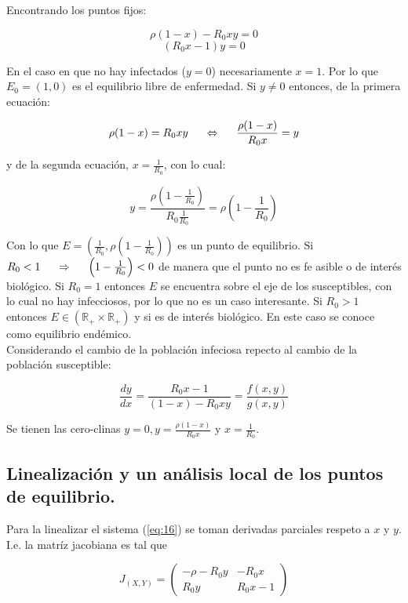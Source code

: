 \documentclass[10pt,oneside]{article}
\theoremstyle{definition}
\begin{document}
\begin{multicols}{2}
    Encontrando los puntos fijos:

    $$\rho(1-x)-R_0xy=0$$
    $$(R_0x-1)y=0$$

    En el caso en que no hay infectados ($y=0$) necesariamente $x=1$. Por lo que $E_0=(1,0)$ es el equilibrio libre de enfermedad. Si $y\neq 0$ entonces, de la primera ecuación: 

    $$\rho(1-x)=R_0xy\hspace{0.5cm}\Leftrightarrow\hspace{0.5cm}\frac{\rho(1-x)}{R_0x}=y$$

    y de la segunda ecuación, $x=\displaystyle{\frac{1}{R_0}}$, con lo cual:

    $$y=\frac{\rho\left(1-\frac{1}{R_0}\right)}{R_0\frac{1}{R_0}}=\rho\left(1-\frac{1}{R_0}\right)$$

    Con lo que $\displaystyle{E=\left(\frac{1}{R_0}, \rho\left(1-\frac{1}{R_0}\right)\right)}$ es un punto de equilibrio. Si $R_0<1\hspace{0.5cm}\Rightarrow\hspace{0.5cm}\left(1-\frac{1}{R_0}\right)<0$ de manera que el punto no es fe asible o de interés biológico. Si $R_0=1$ entonces $E$ se encuentra sobre el eje de los susceptibles, con lo cual no hay infecciosos, por lo que no es un caso interesante. Si $R_0>1$ entonces $E \in (\mathbb{R_+}\times\mathbb{R_+})$ y si es de interés biológico. En este caso se conoce como equilibrio endémico.\\ \newline
    Considerando el cambio de la población infeciosa repecto al cambio de la población susceptible:

    $$\frac{dy}{dx}=\frac{R_0x-1}{(1-x)-R_0xy}=\frac{f(x,y)}{g(x,y)}$$

    Se tienen las cero-clinas $y=0, \displaystyle{y=\frac{\rho(1-x)}{R_0x}}$ y $\displaystyle{x=\frac{1}{R_0}}$. \\\newline

    \subsection{Linealización y un análisis local de los puntos de equilibrio.} Para la  linealizar el sistema (\ref{eq:16}) se toman derivadas parciales respeto a $x $ y $y$. I.e. la matríz jacobiana es tal que 

    $$J_{(X,Y)}=\left(\begin{array}{cc}
       -\rho-R_0y  & -R_0x \\
       R_0y  & R_0x-1
    \end{array}\right)$$


\end{multicols}
\end{document}
